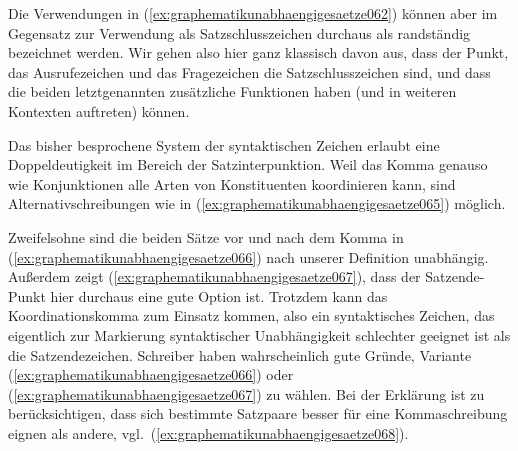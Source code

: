 Die Verwendungen in (\ref{ex:graphematikunabhaengigesaetze062}) können aber im Gegensatz zur Verwendung als Satzschlusszeichen durchaus als randständig bezeichnet werden.
Wir gehen also hier ganz klassisch davon aus, dass der Punkt, das Ausrufezeichen und das Fragezeichen die Satzschlusszeichen sind, und dass die beiden letztgenannten zusätzliche Funktionen haben (und in weiteren Kontexten auftreten) können.

Das bisher besprochene System der syntaktischen Zeichen erlaubt eine Doppeldeutigkeit im Bereich der Satzinterpunktion.
Weil das Komma genauso wie Konjunktionen alle Arten von Konstituenten koordinieren kann, sind Alternativschreibungen wie in (\ref{ex:graphematikunabhaengigesaetze065}) möglich.

\begin{exe}
  \ex\label{ex:graphematikunabhaengigesaetze065}
  \begin{xlist}
  \end{xlist}
\end{exe}

Zweifelsohne sind die beiden Sätze vor und nach dem Komma in (\ref{ex:graphematikunabhaengigesaetze066}) nach unserer Definition unabhängig.
Außerdem zeigt (\ref{ex:graphematikunabhaengigesaetze067}), dass der Satzende-Punkt hier durchaus eine gute Option ist.
Trotzdem kann das Koordinationskomma zum Einsatz kommen, also ein syntaktisches Zeichen, das eigentlich zur Markierung syntaktischer Unabhängigkeit schlechter geeignet ist als die Satzendezeichen.
Schreiber haben wahrscheinlich gute Gründe, Variante (\ref{ex:graphematikunabhaengigesaetze066}) oder (\ref{ex:graphematikunabhaengigesaetze067}) zu wählen.
Bei der Erklärung ist zu berücksichtigen, dass sich bestimmte Satzpaare besser für eine Kommaschreibung eignen als andere, vgl.\ (\ref{ex:graphematikunabhaengigesaetze068}).

\begin{exe}
  \ex\label{ex:graphematikunabhaengigesaetze068}
  \begin{xlist}
  \end{xlist}
\end{exe}


